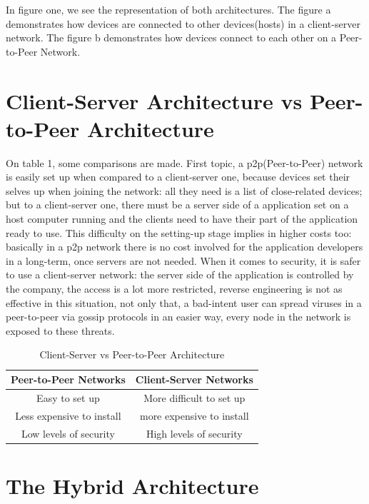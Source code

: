 \documentclass[12pt,a4paper]{article}
\begin{document}
In figure one, we see the representation of both architectures. The figure a demonstrates how devices are connected to other devices(hosts) in a client-server network. The figure b demonstrates how devices connect to each other on a Peer-to-Peer Network. 

\section{Client-Server Architecture vs Peer-to-Peer Architecture}

On table 1, some comparisons are made. First topic, a p2p(Peer-to-Peer) network is easily set up when compared to a client-server one, because devices set their selves up when joining the network: all they need is a list of close-related devices; but to a client-server one, there must be a server side of a application set on a host computer running and the clients need to have their part of the application ready to use. This difficulty on the setting-up stage implies in higher costs too: basically in a p2p network there is no cost involved for the application developers in a long-term, once servers are not needed. When it comes to security, it is safer to use a client-server network: the server side of the application is controlled by the company, the access is a lot more restricted, reverse engineering is not as effective in this situation, not only that, a bad-intent user can spread viruses in a peer-to-peer via gossip protocols in an easier way, every node in the network is exposed to these threats. 

\begin{center}
    \begin{table}[]
        \centering
        \begin{tabular}{c|c}
        Peer-to-Peer Networks     & Client-Server Networks    \\
        \hline
        Easy to set up            & More difficult to set up  \\
        Less expensive to install & more expensive to install \\
        Low levels of security    & High levels of security   
        \end{tabular}
        \caption{Client-Server vs Peer-to-Peer Architecture}
        \label{tab:my_label}
    \end{table}
\end{center}


\section{The Hybrid Architecture}
\end{document}
